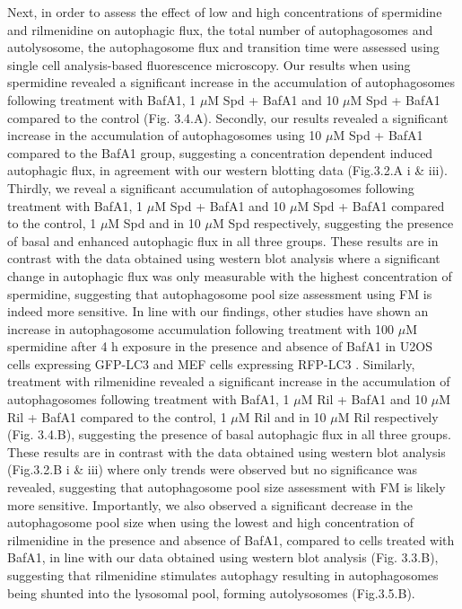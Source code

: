 {Next, in order to assess the effect of low and high concentrations of spermidine and rilmenidine on autophagic flux, the total number of autophagosomes and autolysosome, the autophagosome flux and transition time \citep{loos2014} were assessed using single cell analysis-based fluorescence microscopy. Our results when using spermidine revealed a significant increase in the accumulation of autophagosomes following treatment with BafA1, 1 $\mu$M Spd + BafA1 and 10 $\mu$M Spd + BafA1 compared to the control (Fig. 3.4.A). Secondly, our results revealed a significant increase in the accumulation of autophagosomes using 10 $\mu$M Spd + BafA1 compared to the BafA1 group, suggesting a concentration dependent induced autophagic flux, in agreement with our western blotting data (Fig.3.2.A i \& iii).  Thirdly, we reveal a significant accumulation of autophagosomes following treatment with BafA1, 1 $\mu$M Spd + BafA1 and 10 $\mu$M Spd + BafA1 compared to the control, 1 $\mu$M Spd and in 10 $\mu$M Spd respectively, suggesting the presence of basal and enhanced autophagic flux in all three groups. These results are in contrast with the data obtained using western blot analysis where a significant change in autophagic flux was only measurable with the highest concentration of spermidine, suggesting that autophagosome pool size assessment using FM is indeed more sensitive. In line with our findings, other studies have shown an increase in autophagosome accumulation following treatment with 100 $\mu$M spermidine after 4 h exposure in the presence and absence of BafA1 in U2OS cells expressing GFP-LC3  \citep{Pietrocola2015} and MEF cells expressing RFP-LC3 \citep{Yue2017}. Similarly, treatment with rilmenidine revealed a significant increase in the accumulation of autophagosomes following treatment with BafA1, 1 $\mu$M Ril + BafA1 and 10 $\mu$M Ril + BafA1 compared to the control, 1 $\mu$M Ril and in 10 $\mu$M Ril respectively (Fig. 3.4.B), suggesting the presence of basal autophagic flux in all three groups. These results are in contrast with the data obtained using western blot analysis (Fig.3.2.B i \& iii) where only trends were observed but no significance was revealed, suggesting that autophagosome pool size assessment with FM is likely more sensitive.  Importantly, we also observed a significant decrease in the autophagosome pool size when using the lowest and high concentration of rilmenidine in the presence and absence of BafA1, compared to cells treated with BafA1, in line with our data obtained using western blot analysis (Fig. 3.3.B), suggesting that rilmenidine stimulates autophagy resulting in autophagosomes being shunted into the lysosomal pool, forming autolysosomes (Fig.3.5.B). 

}
